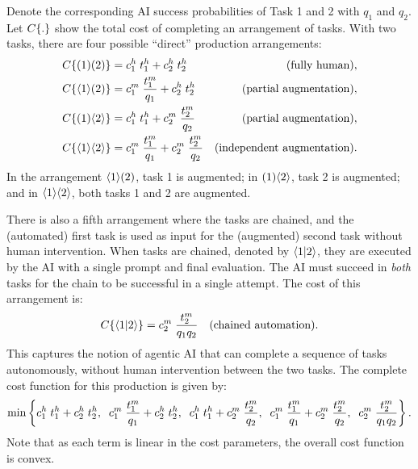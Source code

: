 \documentclass{article}
\theoremstyle{plain}
\theoremstyle{plain}
\begin{document}
Denote the corresponding AI success probabilities of Task 1 and 2 with \(q_1\) and \(q_2\). 
Let $C\{ . \}$ show the total cost of completing an arrangement of tasks.
With two tasks, there are four possible ``direct'' production arrangements:
\begin{align*}
    C\{ ( 1 )( 2 ) \} &= c^{h}_{1} \; t^{h}_{1} + c^{h}_{2} \; t^{h}_{2} & \text{(fully human)}, \\
    C\{ \langle 1 \rangle( 2 ) \} &= c^{m}_{1} \; \frac{t^{m}_{1}}{q_1} + c^{h}_{2} \; t^{h}_{2} & \text{(partial augmentation)}, \\
    C\{ ( 1 )\langle 2 \rangle \} &= c^{h}_{1} \; t^{h}_{1} + c^{m}_{2} \; \frac{t^{m}_{2}}{q_2} & \text{(partial augmentation)}, \\
    C\{ \langle 1 \rangle\langle 2 \rangle \} &= c^{m}_{1} \; \frac{t^{m}_{1}}{q_1} + c^{m}_{2} \; \frac{t^{m}_{2}}{q_2} & \text{(independent augmentation)}.
\end{align*}
In the arrangement $\langle 1 \rangle( 2 )$, task 1 is augmented; in $( 1 )\langle 2 \rangle$, task 2 is augmented; and in $\langle 1 \rangle\langle 2 \rangle$, both tasks 1 and 2 are augmented.  

There is also a fifth arrangement where the tasks are chained, and the (automated) first task is used as input for the (augmented) second task without human intervention.
When tasks are chained, denoted by $\langle 1|2 \rangle$, they are executed by the AI with a single prompt and final evaluation.
The AI must succeed in \emph{both} tasks for the chain to be successful in a single attempt.
The cost of this arrangement is:
\begin{align*}
C\{ \langle 1|2 \rangle \} &= c^{m}_{2} \; \frac{t^{m}_{2}}{q_1 q_2} & \text{(chained automation)}.
\end{align*}
This captures the notion of agentic AI that can complete a sequence of tasks autonomously, without human intervention between the two tasks.
The complete cost function for this production is given by:
\begin{align}
  \min \left\{ 
  c^{h}_{1} \; t^{h}_{1} + c^{h}_{2} \; t^{h}_{2}, \;\; 
  c^{m}_{1} \; \frac{t^{m}_{1}}{q_1} + c^{h}_{2} \; t^{h}_{2}, \;\; 
  c^{h}_{1} \; t^{h}_{1} + c^{m}_{2} \; \frac{t^{m}_{2}}{q_2}, \;\; 
  c^{m}_{1} \; \frac{t^{m}_{1}}{q_1} + c^{m}_{2} \; \frac{t^{m}_{2}}{q_2}, \;\; 
  c^{m}_{2} \; \frac{t^{m}_{2}}{q_1 q_2}
  \right\}.
\end{align}
Note that as each term is linear in the cost parameters, the overall cost function is convex.
\end{document}
